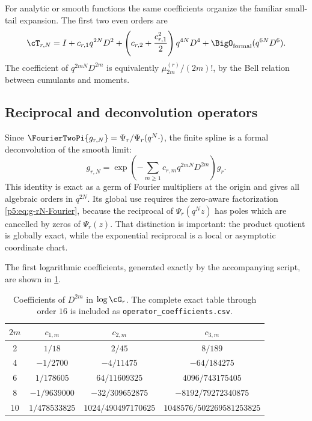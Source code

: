 \documentclass[11pt]{article}
\theoremstyle{definition}
\theoremstyle{remark}
\begin{document}
For analytic or smooth functions the same coefficients organize the familiar
small-tail expansion.  The first two even orders are
\begin{equation}
 \cT_{r,N}
 =I+c_{r,1}q^{2N}D^2+
   \left(c_{r,2}+\frac{c_{r,1}^2}{2}\right)q^{4N}D^4
   +\BigO_{\mathrm{formal}}(q^{6N}D^6).                   \label{p5:eq:tail-first-orders}
\end{equation}
The coefficient of $q^{2mN}D^{2m}$ is equivalently
$\mu_{2m}^{(r)}/(2m)!$, by the Bell relation between cumulants and moments.

\subsection{Reciprocal and deconvolution operators}

Since $\FourierTwoPi{g_{r,N}}=\Psi_r/\Psi_r(q^N\cdot)$, the finite spline is a
formal deconvolution of the smooth limit:
\begin{equation}
 g_{r,N}
 =\exp\!\left(-\sum_{m\ge1}c_{r,m}q^{2mN}D^{2m}\right)g_r. \label{p5:eq:formal-deconvolution}
\end{equation}
This identity is exact as a germ of Fourier multipliers at the origin and gives
all algebraic orders in $q^{2N}$.  Its global use requires the zero-aware
factorization \eqref{p5:eq:g-rN-Fourier}, because the reciprocal of
$\Psi_r(q^Nz)$ has poles which are cancelled by zeros of $\Psi_r(z)$.
That distinction is important: the product quotient is globally exact, while
the exponential reciprocal is a local or asymptotic coordinate chart.

The first logarithmic coefficients, generated exactly by the accompanying
script, are shown in \cref{p5:tab:operator-coefficients}.

\begin{table}[htbp]
\centering
\small
\begin{tabular}{@{}c c c c@{}}
\toprule
$2m$ & $c_{1,m}$ & $c_{2,m}$ & $c_{3,m}$\\
\midrule
2 & $1/18$ & $2/45$ & $8/189$\\
4 & $-1/2700$ & $-4/11475$ & $-64/184275$\\
6 & $1/178605$ & $64/11609325$ & $4096/743175405$\\
8 & $-1/9639000$ & $-32/309652875$ & $-8192/79272340875$\\
10 & $1/478533825$ & $1024/490497170625$ & $1048576/502269581253825$\\
\bottomrule
\end{tabular}
\caption{Coefficients of $D^{2m}$ in $\log\cG_r$.  The complete exact table
through order $16$ is included as \texttt{operator\_coefficients.csv}.}
\label{p5:tab:operator-coefficients}
\end{table}
\end{document}
